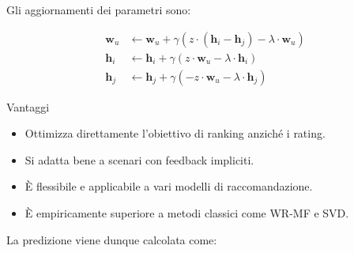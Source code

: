 \documentclass{article}
\begin{document}
Gli aggiornamenti dei parametri sono:

\begin{align*}
\mathbf{w}_u &\leftarrow \mathbf{w}_u + \gamma \left( z \cdot (\mathbf{h}_i - \mathbf{h}_j) - \lambda \cdot \mathbf{w}_u \right) \\
\mathbf{h}_i &\leftarrow \mathbf{h}_i + \gamma \left( z \cdot \mathbf{w}_u - \lambda \cdot \mathbf{h}_i \right) \\
\mathbf{h}_j &\leftarrow \mathbf{h}_j + \gamma \left( -z \cdot \mathbf{w}_u - \lambda \cdot \mathbf{h}_j \right)
\end{align*}


Vantaggi

\begin{itemize}
    \item Ottimizza direttamente l'obiettivo di ranking anziché i rating.
    \item Si adatta bene a scenari con feedback impliciti.
    \item È flessibile e applicabile a vari modelli di raccomandazione.
    \item È empiricamente superiore a metodi classici come WR-MF e SVD.
\end{itemize}

La predizione viene dunque calcolata come:
\end{document}
